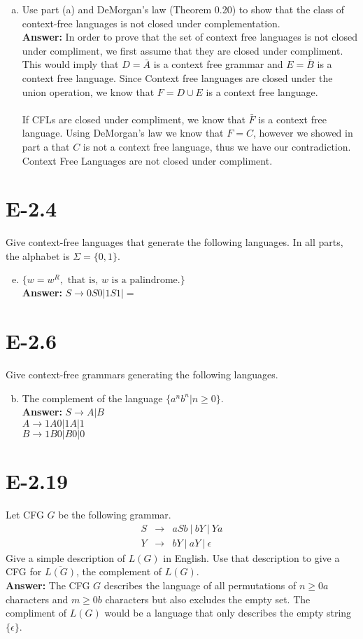 \documentclass{article}
\begin{document}
\begin{enumerate}[a.]
\item Use part (a) and DeMorgan's law (Theorem 0.20) to show that the class
of context-free languages is not closed under complementation.\\
{\bf Answer: } 
In order to prove that the set of context free languages is not closed under compliment, we first assume that they are closed under compliment. This would imply that $D =  \bar{A}$ is a context free grammar and $E = \bar{B}$ is a context free language. Since Context free languages are closed under the union operation, we know that $F = D\cup E$ is a context free language. \\ \\
If CFLs are closed under compliment, we know that $\bar{F}$ is a context free language. Using DeMorgan's law we know that $F = C$, however we showed in part a that $C$ is not a context free language, thus we have our contradiction. Context Free Languages are not closed under compliment.
\end{enumerate}

\section*{E-2.4} %
Give context-free languages that generate the following languages.
In all parts, the alphabet is $\Sigma = \{0,1\}$.
\begin{enumerate}[a.]
\setcounter{enumi}{4}
\item $\{w = w^R, \mbox{\ that is, $w$ is a palindrome.}\}$\\
{\bf Answer: } $S\rightarrow0S0|1S1|=$
\end{enumerate}

\section*{E-2.6} %
Give context-free grammars generating the following languages.
\begin{enumerate}[a.]
\setcounter{enumi}{1}
\item The complement of the language $\{a^nb^n|n\geq 0\}$.\\
{\bf Answer: }
$S\rightarrow A | B$ \\
$A\rightarrow 1A0 | 1A | 1$ \\
$B\rightarrow 1B0 | B0 | 0$
\end{enumerate}

\section*{E-2.19}
Let CFG $G$ be the following grammar.
\begin{eqnarray*}
S & \rightarrow & aSb\ |\ bY\ |\ Ya\\
Y & \rightarrow & bY\ |\ aY\ |\ \epsilon
\end{eqnarray*}
Give a simple description of $L(G)$ in English.
Use that description to give a CFG for $\overline{L(G)}$, the complement of $L(G)$.\\
{\bf Answer: } The CFG $G$ describes the language of all permutations of $n \geq 0 a$ characters and $m \geq 0 b$ characters but also excludes the empty set. The compliment of $L(G)$ would be a language that only describes the empty string $\{ \epsilon \}$.
\end{document}
